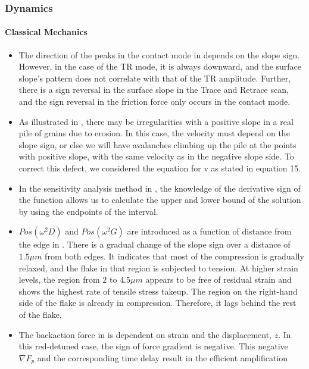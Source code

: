 \documentclass[11pt]{book}
\begin{document}
\subsubsection{Dynamics}
\paragraph{Classical Mechanics}
\begin{itemize}
\item The direction of the peaks in the contact mode in \cite{bhushan2004surface}
depends on the slope sign. However, in the case of the TR mode, it
is always downward, and the surface slope's pattern does not correlate
with that of the TR amplitude. Further, there is a sign reversal in
the surface slope in the Trace and Retrace scan, and the sign reversal
in the friction force only occurs in the contact mode.
\item As illustrated in \cite{ramdas2013algorithmic},
there may be irregularities with a positive slope in a real pile of
grains due to erosion. In this case, the velocity must depend on the
slope sign, or else we will have avalanches climbing up the pile at
the points with positive slope, with the same velocity as in the negative
slope side. To correct this defect, we considered the equation for
v as stated in equation 15.
\item In the sensitivity analysis method in \cite{skalna2008systems},
the knowledge of the derivative sign of the function allows us to
calculate the upper and lower bound of the solution by using the endpoints
of the interval.
\item $Pos\left(\omega^{2}D\right)$ and $Pos\left(\omega^{2}G\right)$
are introduced as a function of distance from the edge in \cite{anagnostopoulos2015stress}.
There is a gradual change of the slope sign over a distance of $1.5\mu m$
from both edges. It indicates that most of the compression is gradually
relaxed, and the flake in that region is subjected to tension. At
higher strain levels, the region from $2$ to $4.5\mu m$ appears
to be free of residual strain and shows the highest rate of tensile
stress takeup. The region on the right-hand side of the flake is already
in compression. Therefore, it lags behind the rest of the flake.
\item The backaction force in \cite{okamoto2015cavity}
is dependent on strain and the displacement, $z$. In this red-detuned
case, the sign of force gradient is negative. This negative $\nabla F_{p}$
and the corresponding time delay result in the efficient amplification

\end{itemize}
\end{document}
